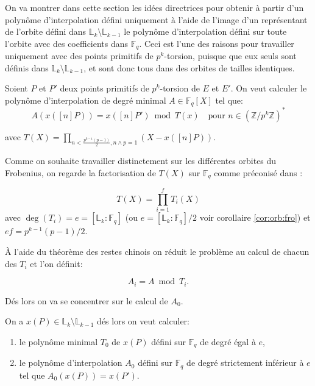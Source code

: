 \documentclass[10pt,a4paper]{book}
\theoremstyle{plain}
\theoremstyle{definition}
\theoremstyle{definition}
\theoremstyle{definition}
\theoremstyle{definition}
\theoremstyle{remark}
\theoremstyle{remark}
\theoremstyle{definition}
\begin{document}
On va montrer dans cette section les idées directrices pour obtenir à partir 
d'un polynôme d'interpolation défini uniquement à l'aide de l'image d'un 
représentant de l'orbite défini dans $\mathbb{L}_k \setminus \mathbb{L}_{k-1}$ 
le polynôme d'interpolation défini sur toute l'orbite avec des coefficients 
dans $\mathbb{F}_q$. Ceci est l'une des raisons pour travailler uniquement avec
des points primitifs de $p^k$-torsion, puisque que eux seuls sont définis dans 
$\mathbb{L}_k \setminus \mathbb{L}_{k-1}$, et sont donc tous dans des orbites 
de tailles identiques.

Soient $P$ et $P'$ deux points primitifs de $p^k$-torsion de $E$ et $E'$. On veut calculer le polynôme d'interpolation de degré minimal $A \in \mathbb{F}_q[X]$ tel que:
\begin{equation}
A(x([n]P))=x([n]P') \bmod T(x) \quad \text{pour } n \in \left( \mathbb{Z}/p^k\mathbb{Z} \right)^*
\end{equation} 

avec $T(X)= \prod_{n < \frac{p^{k-1}(p-1)}{2}, n \wedge p =1} (X-x([n]P))$.

Comme on souhaite travailler distinctement sur les différentes orbites du Frobenius, on regarde la factorisation de $T(X)$ sur $\mathbb{F}_q$ comme préconisé dans \cite{Couveignes96}:

\begin{equation*}
T(X)=\prod_{i=1}^fT_{i}(X)
\end{equation*}
avec $\deg(T_i)=e=[\mathbb{L}_k:\mathbb{F}_q]$ (ou $e=[\mathbb{L}_k:\mathbb{F}_q]/2$ voir corollaire \ref{cor:orb:fro}) et $ef=p^{k-1}(p-1)/2$.

\`A l'aide du théorème des restes chinois on réduit le problème au calcul de chacun des $T_{i}$ et l'on définit:

\begin{equation}
A_{i}=A \bmod{T_{i}}.
\end{equation}

Dés lors on va se concentrer sur le calcul de $A_{0}$.


On a $x(P) \in \mathbb{L}_k \setminus \mathbb{L}_{k-1}$ dés lors on veut 
calculer: 
\begin{enumerate}
\item le polynôme minimal $T_{0}$ de $x(P)$ défini sur $\mathbb{F}_q$ de degré égal à $e$,
\item le polynôme d'interpolation $A_0$ défini sur $\mathbb{F}_q$ de degré strictement inférieur à $e$ tel que $A_0(x(P))=x(P')$.
\end{enumerate}
\end{document}
